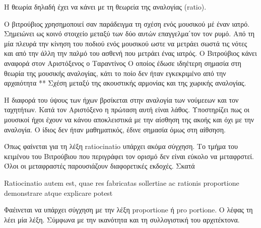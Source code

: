 Η θεωρία δηλαδή έχει να κάνει με τη θεωρεία της αναλογίας (ratio). 

Ο βιτρούβιος χρησημοποιεί σαν παράδειγμα τη σχέση ενός μουσικού μέ έναν ιατρό.
Σημειώνει ως κοινό στοιχείο μεταξύ των δύο αυτών επαγγελμα΄τον τον ρυμό. Από τη
μία πλευρά την κίνηση του ποδιού ενός μουσικού ωστε να μετράει σωστά τις νότες
και από την άλλη την παλμό του ασθενή που μετράει ένας ιατρός. Ο Βιτρούβιος
κάνει αναφορά στον Αριστόξενος ο Ταραντίνος Ο οποίος έδωσε ιδηέτερη σημασία στη
θεωρία της μουσικής αναλογίας, κάτι το ποίο δεν ήταν εγκεκριμένο από την
αρχαιότητα ** Σχέση μεταξύ της ακουστικής αρμονίας και της χωρικής αναλογίας. 

Η διαφορά του ύψους των ήχων βρσίκεται στην αναλογία των νούμεεων και τον
ταχητήτων. Κατά τον Αριστόξενο η πρώταση αυτή είναι λάθος. Υποστηρίζει πως οι
μουσικοί ήχοι έχουν να κάνου αποκλειστικά με την αίσθηση της ακοής και όχι με
την αναλογία. Ο ίδιος δεν ήταν μαθηματικός, έδινε σημασία όμως στη αίθσηση. 

Όπως φαίνεται για τη λέξη ratiocinatio υπάρχει ακόμα σύγχηση. Το τμήμα του
κειμένου του Βιτρούβιου που περιγράφει τον ορισμό δεν είναι εύκολο να
μεταφρστεί. Όλοι οι μεταφραστές παρουσιάζουν διαφορετικές εκδοχές. Σκατά

Ratiocinatio autem est, quae res fabricatas sollertiae ac rationis proportione
demonstrare atque explicare potest

Φαέινεται να υπάρχει σύγχηση με την λέξη proportione ή pro portione. Ο λέφας τη
λέει μία λέξη. 
 Σύμφωνα με την ικανότητα και τη συλλογιστική του αρχιτέκτονα.